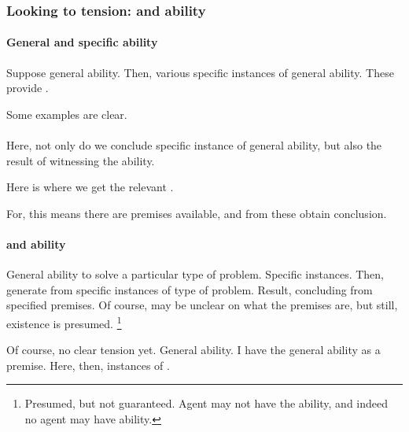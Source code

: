 \subsubsection{Looking to tension: \adB{} and ability}
\label{sec:looking-tension}


\paragraph{General and specific ability}

\begin{note}
  Suppose general ability.
  Then, various specific instances of general ability.
  These provide .
\end{note}

\begin{note}[Examples]
  Some examples are clear.
\end{note}


\paragraph{}


\begin{note}
  Here, not only do we conclude specific instance of general ability, but also the result of witnessing the ability.

  Here is where we get the relevant \itp{}.

  For, this means there are premises available, and from these obtain conclusion.
\end{note}

\paragraph{\adB{} and ability}

\begin{note}
  General ability to solve a particular type of problem.
  Specific instances.
  Then, generate  from specific instances of type of problem.
  Result, concluding from specified premises.
  Of course, may be unclear on what the premises are, but still, existence is presumed.%
  \footnote{
    Presumed, but not guaranteed.
    Agent may not have the ability, and indeed no agent may have ability.
  }
\end{note}

\begin{note}
  Of course, no clear tension yet.
  General ability.
  I have the general ability as a premise.
  Here, then, instances of \adA{}.
\end{note}

